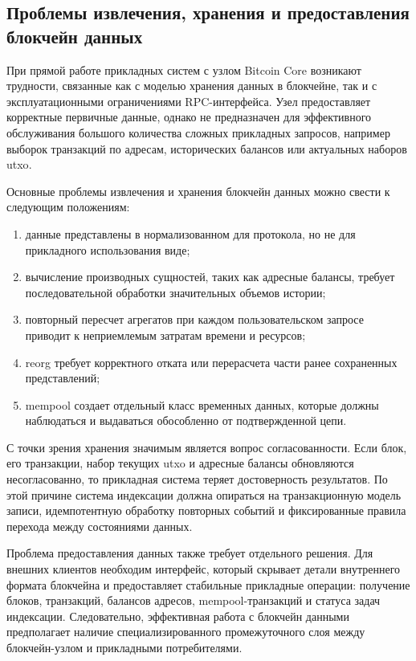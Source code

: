 ﻿\subsection{Проблемы извлечения, хранения и предоставления блокчейн данных}

При прямой работе прикладных систем с узлом Bitcoin Core возникают трудности,
связанные как с моделью хранения данных в блокчейне, так и с эксплуатационными
ограничениями RPC-интерфейса. Узел предоставляет корректные первичные данные,
однако не предназначен для эффективного обслуживания большого количества
сложных прикладных запросов, например выборок транзакций по адресам,
исторических балансов или актуальных наборов \gls{utxo}.

Основные проблемы извлечения и хранения блокчейн данных можно свести к
следующим положениям:
\begin{enumerate}
    \item данные представлены в нормализованном для протокола, но не для
    прикладного использования виде;
    \item вычисление производных сущностей, таких как адресные балансы,
    требует последовательной обработки значительных объемов истории;
    \item повторный пересчет агрегатов при каждом пользовательском запросе
    приводит к неприемлемым затратам времени и ресурсов;
    \item reorg требует корректного отката или перерасчета части ранее
    сохраненных представлений;
    \item mempool создает отдельный класс временных данных, которые должны
    наблюдаться и выдаваться обособленно от подтвержденной цепи.
\end{enumerate}

С точки зрения хранения значимым является вопрос согласованности. Если блок,
его транзакции, набор текущих \gls{utxo} и адресные балансы обновляются
несогласованно, то прикладная система теряет достоверность результатов. По этой
причине система индексации должна опираться на транзакционную модель записи,
идемпотентную обработку повторных событий и фиксированные правила перехода
между состояниями данных.

Проблема предоставления данных также требует отдельного решения. Для внешних
клиентов необходим интерфейс, который скрывает детали внутреннего формата
блокчейна и предоставляет стабильные прикладные операции: получение блоков,
транзакций, балансов адресов, mempool-транзакций и статуса задач индексации.
Следовательно, эффективная работа с блокчейн данными предполагает наличие
специализированного промежуточного слоя между блокчейн-узлом и прикладными
потребителями.
